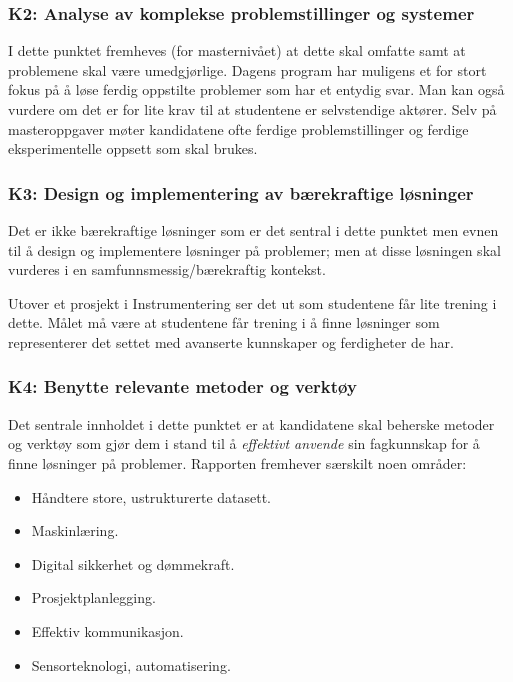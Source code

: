 \subsubsection{K2: Analyse av komplekse problemstillinger og systemer}

I dette punktet fremheves (for masternivået) at dette skal omfatte  samt at problemene skal være umedgjørlige. Dagens program har muligens et for stort fokus på å løse ferdig oppstilte problemer som har et entydig svar. Man kan også vurdere om det er for lite krav til at studentene er selvstendige aktører. Selv på masteroppgaver møter kandidatene ofte ferdige problemstillinger og ferdige eksperimentelle oppsett som skal brukes.

\subsubsection{K3: Design og implementering av bærekraftige løsninger}

Det er ikke bærekraftige løsninger som er det sentral i dette punktet men evnen til å design og implementere løsninger på problemer; men at disse løsningen skal vurderes i en samfunnsmessig/bærekraftig kontekst.

Utover et prosjekt i Instrumentering ser det ut som studentene får lite trening i dette. Målet må være at studentene får trening i å finne løsninger som representerer det settet med avanserte kunnskaper og ferdigheter de har.

\subsubsection{K4: Benytte relevante metoder og verktøy}
Det sentrale innholdet i dette punktet er at kandidatene skal beherske metoder og verktøy som gjør dem i stand til å \emph{effektivt anvende} sin fagkunnskap for å finne løsninger på problemer. Rapporten fremhever særskilt noen områder:

\begin{itemize}
	\item Håndtere store, ustrukturerte datasett.
	\item Maskinlæring.
	\item Digital sikkerhet og dømmekraft.
	\item Prosjektplanlegging.
	\item Effektiv kommunikasjon.
	\item Sensorteknologi, automatisering.
\end{itemize}

